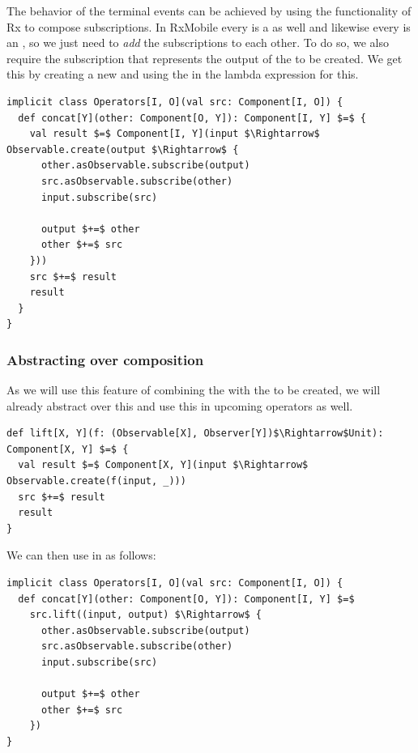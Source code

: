 The behavior of the terminal events can be achieved by using the functionality of Rx to compose subscriptions. In RxMobile every \obv is a \subs as well and likewise every \comp is an \obv, so we just need to \textit{add} the subscriptions to each other. To do so, we also require the subscription that represents the output of the \comp to be created. We get this by creating a new \obs and using the \obv in the lambda expression for this.

\begin{minipage}{\linewidth}
\begin{lstlisting}[style=ScalaStyle, caption={Linear composition operator \code{concat}}, label={lst:concat-operator}]
implicit class Operators[I, O](val src: Component[I, O]) {
  def concat[Y](other: Component[O, Y]): Component[I, Y] $=$ {
    val result $=$ Component[I, Y](input $\Rightarrow$ Observable.create(output $\Rightarrow$ {
      other.asObservable.subscribe(output)
      src.asObservable.subscribe(other)
      input.subscribe(src)

      output $+=$ other
      other $+=$ src
    }))
    src $+=$ result
    result
  }
}
\end{lstlisting}
\end{minipage}

\subsubsection{Abstracting over composition}
As we will use this feature of combining the \subs with the \comp to be created, we will already abstract over this and use this in upcoming operators as well.

\begin{minipage}{\linewidth}
\begin{lstlisting}[style=ScalaStyle, caption={\code{lift} operator}, label={lst:lift-operator}]
def lift[X, Y](f: (Observable[X], Observer[Y])$\Rightarrow$Unit): Component[X, Y] $=$ {
  val result $=$ Component[X, Y](input $\Rightarrow$ Observable.create(f(input, _)))
  src $+=$ result
  result
}
\end{lstlisting}
\end{minipage}

We can then use  in  as follows:

\begin{minipage}{\linewidth}
\begin{lstlisting}[style=ScalaStyle, caption={Revised implementation of the \code{concat} operator}, label={lst:concat-revised}]
implicit class Operators[I, O](val src: Component[I, O]) {
  def concat[Y](other: Component[O, Y]): Component[I, Y] $=$
    src.lift((input, output) $\Rightarrow$ {
      other.asObservable.subscribe(output)
      src.asObservable.subscribe(other)
      input.subscribe(src)

      output $+=$ other
      other $+=$ src
    })
}
\end{lstlisting}
\end{minipage}


